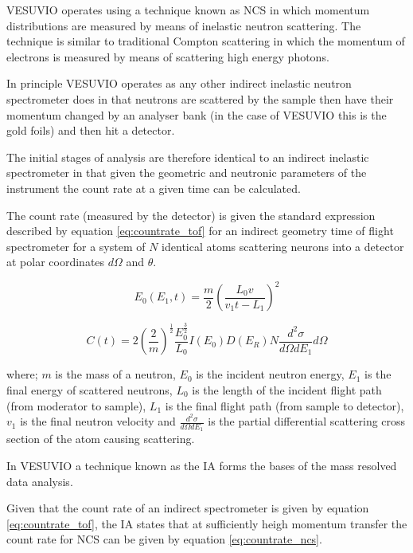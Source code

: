 \documentclass[a4paper]{article}
\begin{document}
VESUVIO operates using a technique known as \gls*{NCS} in which momentum
distributions are measured by means of inelastic neutron scattering. The
technique is similar to traditional Compton scattering in which the momentum of
electrons is measured by means of scattering high energy photons.

In principle VESUVIO operates as any other indirect inelastic neutron
spectrometer does in that neutrons are scattered by the sample then have their
momentum changed by an analyser bank (in the case of VESUVIO this is the gold
foils) and then hit a detector.

The initial stages of analysis are therefore identical to an indirect inelastic
spectrometer in that given the geometric and neutronic parameters of the
instrument the count rate at a given time can be calculated.

The count rate (measured by the detector) is given the standard expression
described by equation \ref{eq:countrate_tof} for an indirect geometry time of
flight spectrometer \cite{Windsor1986} for a system of $N$ identical atoms
scattering neurons into a detector at polar coordinates $d\Omega$ and $\theta$.

\begin{equation}
  \label{eq:countrate_tof_e0}
  E_{0}(E_{1}, t) =
    \frac{m}{2}
    \left(\frac{L_{0} v}{v_{1} t - L_{1}}\right)^{2}
\end{equation}

\begin{equation}
  \label{eq:countrate_tof}
  C(t) =
    2\left(\frac{2}{m}\right)^{\frac{1}{2}}
    \frac{E_{0}^{\frac{3}{2}}}{L_{0}}
    I(E_{0}) D(E_{R})
    N \frac{d^{2}\sigma}{d\Omega dE_{1}} d\Omega
\end{equation}

where; $m$ is the mass of a neutron, $E_{0}$ is the incident neutron energy,
$E_{1}$ is the final energy of scattered neutrons, $L_{0}$ is the length of the
incident flight path (from moderator to sample), $L_{1}$ is the final flight
path (from sample to detector), $v_{1}$ is the final neutron velocity and
$\frac{d^{2} \sigma}{d\Omega dE_{1}}$ is the partial differential scattering
cross section of the atom causing scattering.

In VESUVIO a technique known as the \gls*{IA} forms the bases of the mass
resolved data analysis.

Given that the count rate of an indirect spectrometer is given by equation
\ref{eq:countrate_tof}, the \gls*{IA} states that at sufficiently heigh
momentum transfer the count rate for \gls*{NCS} can be given by equation
\ref{eq:countrate_ncs}.
\end{document}
